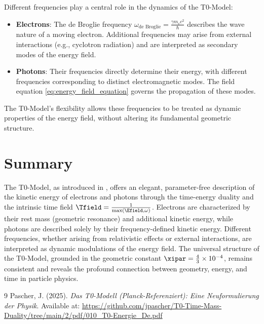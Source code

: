 Different frequencies play a central role in the dynamics of the T0-Model:

\begin{itemize}
	\item \textbf{Electrons}: The de Broglie frequency \(\omega_{\text{de Broglie}} = \frac{\gamma m_e c^2}{\hbar}\) describes the wave nature of a moving electron. Additional frequencies may arise from external interactions (e.g., cyclotron radiation) and are interpreted as secondary modes of the energy field.
	\item \textbf{Photons}: Their frequencies directly determine their energy, with different frequencies corresponding to distinct electromagnetic modes. The field equation \eqref{eq:energy_field_equation} governs the propagation of these modes.
\end{itemize}

The T0-Model's flexibility allows these frequencies to be treated as dynamic properties of the energy field, without altering its fundamental geometric structure.

\section{Summary}
\label{sec:summary}

The T0-Model, as introduced in \cite{pascher_t0_energy_2025}, offers an elegant, parameter-free description of the kinetic energy of electrons and photons through the time-energy duality and the intrinsic time field \( \Tfield = \frac{1}{\max(\Efield, \omega)} \). Electrons are characterized by their rest mass (geometric resonance) and additional kinetic energy, while photons are described solely by their frequency-defined kinetic energy. Different frequencies, whether arising from relativistic effects or external interactions, are interpreted as dynamic modulations of the energy field. The universal structure of the T0-Model, grounded in the geometric constant \(\xipar = \frac{4}{3} \times 10^{-4}\), remains consistent and reveals the profound connection between geometry, energy, and time in particle physics.

\begin{thebibliography}{9}
	Pascher, J. (2025). \textit{Das T0-Modell (Planck-Referenziert): Eine Neuformulierung der Physik}. 
	Available at: \url{https://github.com/jpascher/T0-Time-Mass-Duality/tree/main/2/pdf/010_T0-Energie_De.pdf}
\end{thebibliography}
